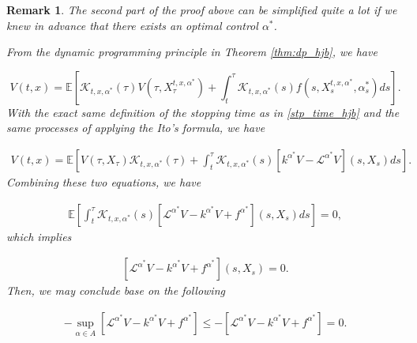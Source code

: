 \documentclass{article}
\newtheorem{rk}{Remark}
\begin{document}
\begin{rk}
The second part of the proof above can be simplified quite a lot if we knew in advance that there exists an optimal control $\alpha^*$. 

From the dynamic programming principle in Theorem \ref{thm:dp_hjb}, we have 

\begin{equation*}
V(t,x)=\mathbb{E}\left[\mathcal{K}_{t,x,\alpha^*}(\tau)V(\tau,X_\tau^{t,x,\alpha^*})+\int^\tau_t\mathcal{K}_{t,x,\alpha^*}(s)f(s,X_s^{t,x,\alpha^*},\alpha^*_s)ds\right].
\end{equation*}
With the exact same definition of the stopping time as in \eqref{stp_time_hjb} and the same processes of applying the Ito's formula, we have

\begin{equation*}
\begin{aligned}
V(t,x)=\mathbb{E}\left[V(\tau,X_\tau)\mathcal{K}_{t,x,\alpha^*}(\tau)+\int^\tau_t\mathcal{K}_{t,x,\alpha^*}(s)[k^{\alpha^*}V-\mathcal{L}^{\alpha^*}V](s,X_s)ds\right].
\end{aligned}
\end{equation*}
Combining these two equations, we have

\begin{equation*}
\begin{aligned}
\mathbb{E}\left[\int^\tau_t\mathcal{K}_{t,x,\alpha^*}(s)[\mathcal{L}^{\alpha^*}V-k^{\alpha^*}V+f^{\alpha^*}](s,X_s)ds\right]=0,
\end{aligned}
\end{equation*}
which implies

\begin{equation*}
\begin{aligned}
[\mathcal{L}^{\alpha^*}V-k^{\alpha^*}V+f^{\alpha^*}](s,X_s)=0.
\end{aligned}
\end{equation*}
 Then, we may conclude base on the following

\begin{equation*}
\begin{aligned}
-\sup_{\alpha\in A}[\mathcal{L}^{\alpha^*}V-k^{\alpha^*}V+f^{\alpha^*}]\leq-[\mathcal{L}^{\alpha^*}V-k^{\alpha^*}V+f^{\alpha^*}]=0.
\end{aligned}
\end{equation*}

\end{rk}
\end{document}

